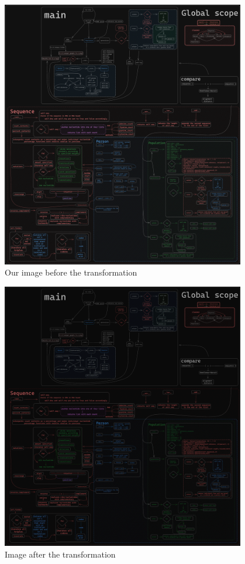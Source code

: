 \documentclass[12pt, a4paper]{article}
\begin{document}
\begin{figure}[H]
    \begin{center}
        \includegraphics[width=0.95\textwidth]{figures/first requirement before.png}
    \end{center}
    \caption{Our image before the transformation}\label{fig:before}
\end{figure}

\begin{figure}[H]
    \begin{center}
        \includegraphics[width=0.95\textwidth]{figures/first requirement after.png}
    \end{center}
    \caption{Image after the transformation}\label{fig:after}
\end{figure}
\end{document}
